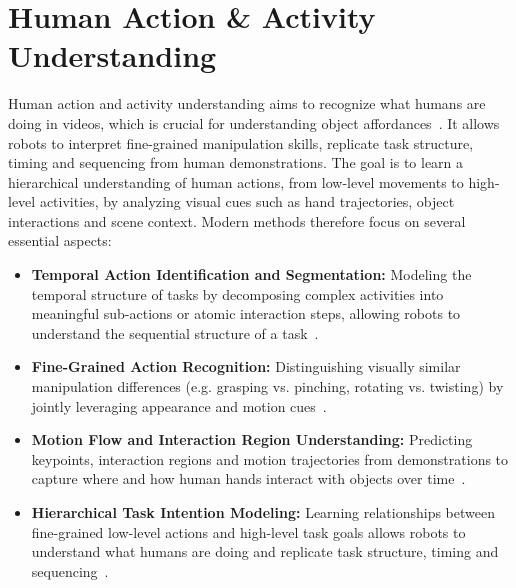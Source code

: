 \section{Human Action \& Activity Understanding}
Human action and activity understanding aims to recognize what humans are doing in videos, which is crucial for understanding object affordances~\cite{Eze2024LearningBW}. It allows robots to interpret fine-grained manipulation skills, replicate task structure, timing and sequencing from human demonstrations. The goal is to learn a hierarchical understanding of human actions, from low-level movements to high-level activities, by analyzing visual cues such as hand trajectories, object interactions and scene context.
Modern methods therefore focus on several essential aspects:
\begin{itemize}
    \item \textbf{Temporal Action Identification and Segmentation:} 
    Modeling the temporal structure of tasks by decomposing complex activities into meaningful sub-actions or atomic interaction steps, allowing robots to understand the sequential structure of a task~\cite{Xin2023LearningIR, Sener2018UnsupervisedLA}.
    
    \item \textbf{Fine-Grained Action Recognition:} Distinguishing visually similar manipulation differences (e.g. grasping vs. pinching, rotating vs. twisting) by jointly leveraging appearance and motion cues~\cite{Ma2018RegionsequenceBS, Pieropan2013FunctionalOD}.
    
    \item \textbf{Motion Flow and Interaction Region Understanding:} Predicting keypoints, interaction regions and motion trajectories from demonstrations to capture where and how human hands interact with objects over time~\cite{Xin2023LearningIR}.
    
    \item \textbf{Hierarchical Task Intention Modeling:} Learning relationships between fine-grained low-level actions and high-level task goals allows robots to understand what humans are doing and replicate task structure, timing and sequencing~\cite{Pieropan2013FunctionalOD, Koppula2012LearningHA}.
\end{itemize}


